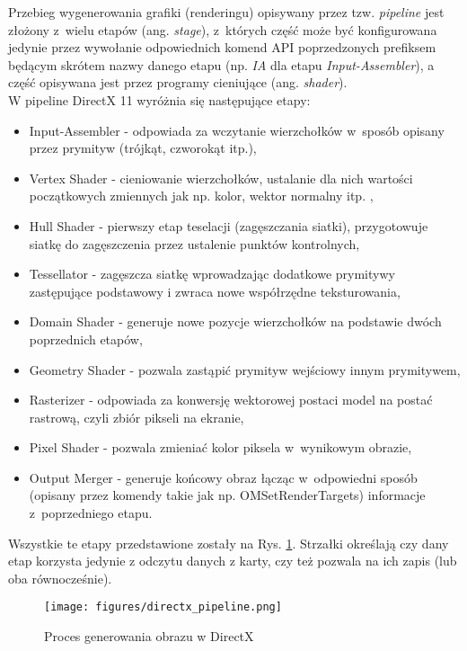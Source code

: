 Przebieg wygenerowania grafiki (renderingu) opisywany przez tzw. \emph{pipeline} jest złożony z~wielu etapów (ang. \emph{stage}), z~których część może być konfigurowana jedynie przez wywołanie odpowiednich komend API poprzedzonych prefiksem będącym skrótem nazwy danego etapu (np. \emph{IA} dla etapu \emph{Input-Assembler}), a część opisywana jest przez programy cieniujące (ang. \emph{shader}).\\
W pipeline DirectX 11 wyróżnia się następujące etapy:
\begin{itemize}
\item Input-Assembler - odpowiada za wczytanie wierzchołków w~sposób opisany przez prymityw (trójkąt, czworokąt itp.),
\item Vertex Shader - cieniowanie wierzchołków, ustalanie dla nich wartości początkowych zmiennych jak np. kolor, wektor normalny itp. ,
\item Hull Shader - pierwszy etap teselacji (zagęszczania siatki), przygotowuje siatkę do zagęszczenia przez ustalenie punktów kontrolnych,
\item Tessellator - zagęszcza siatkę wprowadzając dodatkowe prymitywy zastępujące podstawowy i zwraca nowe współrzędne teksturowania,
\item Domain Shader - generuje nowe pozycje wierzchołków na podstawie dwóch poprzednich etapów,
\item Geometry Shader - pozwala zastąpić prymityw wejściowy innym prymitywem,
\item Rasterizer - odpowiada za konwersję wektorowej postaci model na postać rastrową, czyli zbiór pikseli na ekranie,
\item Pixel Shader - pozwala zmieniać kolor piksela w~wynikowym obrazie,
\item Output Merger - generuje końcowy obraz łącząc w~odpowiedni sposób (opisany przez komendy takie jak np. OMSetRenderTargets) informacje z~poprzedniego etapu.
\end{itemize}

Wszystkie te etapy przedstawione zostały na Rys. \ref{directx_pipeline}. Strzałki określają czy dany etap korzysta jedynie z odczytu danych z karty, czy też pozwala na ich zapis (lub oba równocześnie).

\begin{figure}
\begin{center}
\texttt{[image: figures/directx\_pipeline.png]}
\caption{Proces generowania obrazu w DirectX}
\label{directx_pipeline}
\end{center}
\end{figure}

